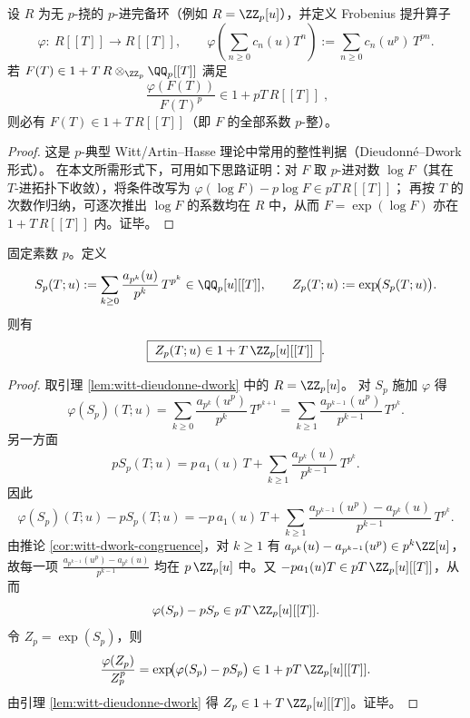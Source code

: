 \begin{lemma}\label{lem:witt-dieudonne-dwork}
设 \(R\) 为无 \(p\)-挠的 \(p\)-进完备环（例如 \(R=\ZZ_p[u]\)），并定义 Frobenius 提升算子
\[
\varphi:\ R[[T]]\to R[[T]],\qquad
\varphi\!\left(\sum_{n\ge 0}c_n(u)T^n\right):=\sum_{n\ge 0}c_n(u^p)\,T^{pn}.
\]
若 \(F(T)\in 1+T\,R\otimes_{\ZZ_p}\QQ_p[[T]]\) 满足
\[
\boxed{\;
\frac{\varphi(F(T))}{F(T)^p}\in 1+pT\,R[[T]]\;},
\]
则必有 \(F(T)\in 1+T\,R[[T]]\)（即 \(F\) 的全部系数 \(p\)-整）。
\end{lemma}
\begin{proof}
这是 \(p\)-典型 Witt/Artin--Hasse 理论中常用的整性判据（Dieudonn\'e--Dwork 形式）。
在本文所需形式下，可用如下思路证明：对 \(F\) 取 \(p\)-进对数 \(\log F\)（其在 \(T\)-进拓扑下收敛），将条件改写为
\(
\varphi(\log F)-p\log F\in pT\,R[[T]]
\)；
再按 \(T\) 的次数作归纳，可逐次推出 \(\log F\) 的系数均在 \(R\) 中，从而 \(F=\exp(\log F)\) 亦在 \(1+T\,R[[T]]\) 内。证毕。
\end{proof}

\begin{theorem}\label{thm:witt-dwork-zp-integrality}
固定素数 \(p\)。定义
\[
S_p(T;u):=\sum_{k\ge 0}\frac{a_{p^k}(u)}{p^k}\,T^{p^k}\in \QQ_p[u][[T]],
\qquad
Z_p(T;u):=\exp\!\bigl(S_p(T;u)\bigr).
\]
则有
\[
\boxed{\;
Z_p(T;u)\in 1+T\,\ZZ_p[u][[T]]\; }.
\]
\end{theorem}
\begin{proof}
取引理 \ref{lem:witt-dieudonne-dwork} 中的 \(R=\ZZ_p[u]\)。
对 \(S_p\) 施加 \(\varphi\) 得
\[
\varphi(S_p)(T;u)
=\sum_{k\ge 0}\frac{a_{p^k}(u^p)}{p^k}\,T^{p^{k+1}}
=\sum_{k\ge 1}\frac{a_{p^{k-1}}(u^p)}{p^{k-1}}\,T^{p^{k}}.
\]
另一方面
\[
pS_p(T;u)
=p\,a_1(u)\,T+\sum_{k\ge 1}\frac{a_{p^k}(u)}{p^{k-1}}\,T^{p^k}.
\]
因此
\[
\varphi(S_p)(T;u)-pS_p(T;u)
=-p\,a_1(u)\,T+\sum_{k\ge 1}\frac{a_{p^{k-1}}(u^p)-a_{p^k}(u)}{p^{k-1}}\,T^{p^k}.
\]
由推论 \ref{cor:witt-dwork-congruence}，对 \(k\ge 1\) 有
\(
a_{p^k}(u)-a_{p^{k-1}}(u^p)\in p^k\ZZ[u]
\)，
故每一项
\(
\frac{a_{p^{k-1}}(u^p)-a_{p^k}(u)}{p^{k-1}}
\)
均在 \(p\,\ZZ_p[u]\) 中。又 \(-p a_1(u)T\in pT\,\ZZ_p[u][[T]]\)，从而
\[
\varphi(S_p)-pS_p\in pT\,\ZZ_p[u][[T]].
\]
令 \(Z_p=\exp(S_p)\)，则
\[
\frac{\varphi(Z_p)}{Z_p^p}
=\exp\!\bigl(\varphi(S_p)-pS_p\bigr)\in 1+pT\,\ZZ_p[u][[T]].
\]
由引理 \ref{lem:witt-dieudonne-dwork} 得 \(Z_p\in 1+T\,\ZZ_p[u][[T]]\)。证毕。
\end{proof}

